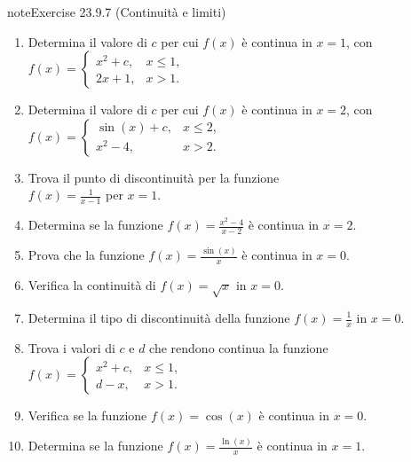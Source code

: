 \documentclass[letterpaper,10pt,italian]{jupyterBook}
\begin{document}
\begin{sphinxadmonition}{note}{Exercise 23.9.7 (Continuità e limiti)}


\begin{enumerate}
%
\item {} 
\sphinxAtStartPar
Determina il valore di \(c\) per cui \(f(x)\) è continua in \(x=1\), con\\
\(f(x) = \begin{cases} 
x^2 + c, & x \leq 1, \\
2x + 1, & x > 1.
\end{cases}\)

\item {} 
\sphinxAtStartPar
Determina il valore di \(c\) per cui \(f(x)\) è continua in \(x=2\), con\\
\(f(x) = \begin{cases} 
\sin(x) + c, & x \leq 2, \\
x^2 - 4, & x > 2.
\end{cases}\)

\item {} 
\sphinxAtStartPar
Trova il punto di discontinuità per la funzione\\
\(f(x) = \frac{1}{x - 1}\) per \(x = 1\).

\item {} 
\sphinxAtStartPar
Determina se la funzione \(f(x) = \frac{x^2 - 4}{x - 2}\) è continua in \(x=2\).

\item {} 
\sphinxAtStartPar
Prova che la funzione \(f(x) = \frac{\sin(x)}{x}\) è continua in \(x=0\).

\item {} 
\sphinxAtStartPar
Verifica la continuità di \(f(x) = \sqrt{x}\) in \(x=0\).

\item {} 
\sphinxAtStartPar
Determina il tipo di discontinuità della funzione \(f(x) = \frac{1}{x}\) in \(x=0\).

\item {} 
\sphinxAtStartPar
Trova i valori di \(c\) e \(d\) che rendono continua la funzione\\
\(f(x) = \begin{cases} 
x^2 + c, & x \leq 1, \\
d - x, & x > 1.
\end{cases}\)

\item {} 
\sphinxAtStartPar
Verifica se la funzione \(f(x) = \cos(x)\) è continua in \(x=0\).

\item {} 
\sphinxAtStartPar
Determina se la funzione \(f(x) = \frac{\ln(x)}{x}\) è continua in \(x=1\).

\end{enumerate}
\end{sphinxadmonition}
 \label{exercise:ch/infinitesimal_calculus/analysis-problems-exercise-7}
\end{document}
